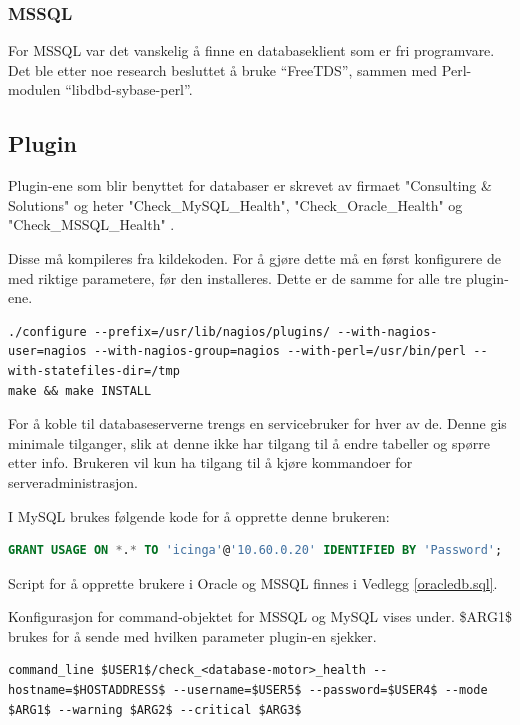 \subsubsection{MSSQL}
For MSSQL var det vanskelig å finne en databaseklient som er fri programvare. Det ble etter noe research besluttet å bruke ``FreeTDS''\cite{freetds}, sammen med Perl-modulen ``libdbd-sybase-perl''.

\subsection{Plugin}
Plugin-ene som blir benyttet for databaser er skrevet av firmaet "Consulting \& Solutions" og heter "Check\_MySQL\_Health", "Check\_Oracle\_Health" og "Check\_MSSQL\_Health" \cite{consol}.

Disse må kompileres fra kildekoden. For å gjøre dette må en først konfigurere de med riktige parametere, før den installeres. Dette er de samme for alle tre plugin-ene.

\begin{lstlisting}[style=example]
./configure --prefix=/usr/lib/nagios/plugins/ --with-nagios-user=nagios --with-nagios-group=nagios --with-perl=/usr/bin/perl --with-statefiles-dir=/tmp
make && make INSTALL
\end{lstlisting}

For å koble til databaseserverne trengs en servicebruker for hver av de. Denne gis minimale tilganger, slik at denne ikke har tilgang til å endre tabeller og spørre etter info. Brukeren vil kun ha tilgang til å kjøre kommandoer for serveradministrasjon\cite{mysqlpriv}.

I MySQL brukes følgende kode for å opprette denne brukeren:
\begin{lstlisting}[language=SQL,style=example]
GRANT USAGE ON *.* TO 'icinga'@'10.60.0.20' IDENTIFIED BY 'Password';
\end{lstlisting}

Script for å opprette brukere i Oracle og MSSQL finnes i Vedlegg \ref{oracledb.sql}.

Konfigurasjon for command-objektet for MSSQL og MySQL vises under. \$ARG1\$ brukes for å sende med hvilken parameter plugin-en sjekker.
\begin{lstlisting}[style=example]
    command_line $USER1$/check_<database-motor>_health --hostname=$HOSTADDRESS$ --username=$USER5$ --password=$USER4$ --mode $ARG1$ --warning $ARG2$ --critical $ARG3$
\end{lstlisting}

